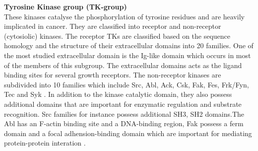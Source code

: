 \documentclass[a4paper, 11pt]{article}
\begin{document}
\textbf{Tyrosine Kinase group (TK-group)}\\
These kinases catalyse the phosphorylation of tyrosine residues and are heavily implicated in cancer. They are classified into receptor and non-receptor (cytosiolic) kinases. The receptor TKs are classified based on the sequence homology and the structure of their extracellular domains into 20 families. One of the most studied extracellular domain is the Ig-like domain which occurs in most of the members of this subgroup. The extracellular domains acts as the ligand binding sites for several growth receptors. The non-receptor kinases are subdivided into 10 families which include Src, Abl, Ack, Csk, Fak, Fes, Frk/Fyn, Tec and Syk \cite{rakshambikai2015typical}. In addition to the kinase catalytic domain, they also possess additional domains that are important for enzymatic regulation and substrate recognition. Src families for instance possess additional SH3, SH2 domains.The Abl has an F-actin binding site and a DNA-binding region, Fak possess a ferm domain and a focal adhension-binding domain which are important for mediating protein-protein interation \cite{duong2013human,rakshambikai2015typical}.\\
\end{document}
